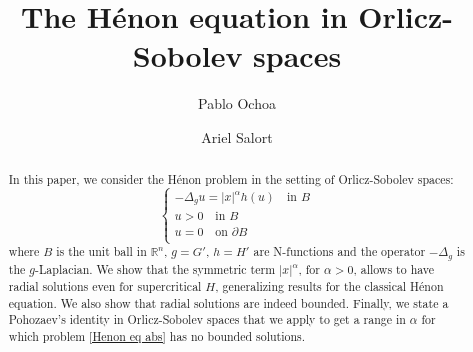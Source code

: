 \documentclass[leqno,twoside, 12pt]{amsart}
\theoremstyle{plain}
\numberwithin{equation}{section} \numberwithin{figure}{section}
\theoremstyle{definition}
\numberwithin{equation}{section}
\begin{document}
\title[The H\'enon equation in Orlicz-Sobolev spaces]{The H\'enon equation in Orlicz-Sobolev spaces}

\author{Pablo Ochoa}

\address{P. Ochoa. \newline Universidad Nacional de Cuyo, Fac. de Ingenier\'ia. CONICET. Universidad J. A. Maza\\Parque Gral. San Mart\'in 5500\\
Mendoza, Argentina.}


\author{Ariel Salort}
\address{A. Salort \newline Departamento de Matem\'aticas y Ciencia de Datos, Universidad San Pablo-CEU, CEU Universities, Urbanizaci\'on Montepr\'incipe, 28660 Boadilla del Monte, Madrid, Spain. }

 


\parskip 3pt

\maketitle

\begin{abstract}In this paper, we consider the H\'enon problem in the setting of Orlicz-Sobolev spaces:
\begin{equation}\label{Henon eq abs}
\begin{cases}
-\Delta_g u= |x|^\alpha h( u) \quad \text{in }B\\
u>0 \quad \text{in }B\\
u= 0 \quad \text{on }\partial B\\
\end{cases}
\end{equation}where $B$ is the unit ball in $\mathbb{R}^n$,  $g=G'$, $h=H'$ are N-functions and the operator $-\Delta_g$ is the $g$-Laplacian. We show that the symmetric term $|x|^\alpha$, for $\alpha>0$, allows to have radial solutions even for supercritical $H$, generalizing results for the classical H\'enon equation. We also show that radial solutions are indeed bounded. Finally, we  state a Pohozaev's identity  in Orlicz-Sobolev spaces that we apply to get a range in $\alpha$ for which problem \eqref{Henon eq abs} has no bounded solutions.


\end{abstract}
\end{document}

